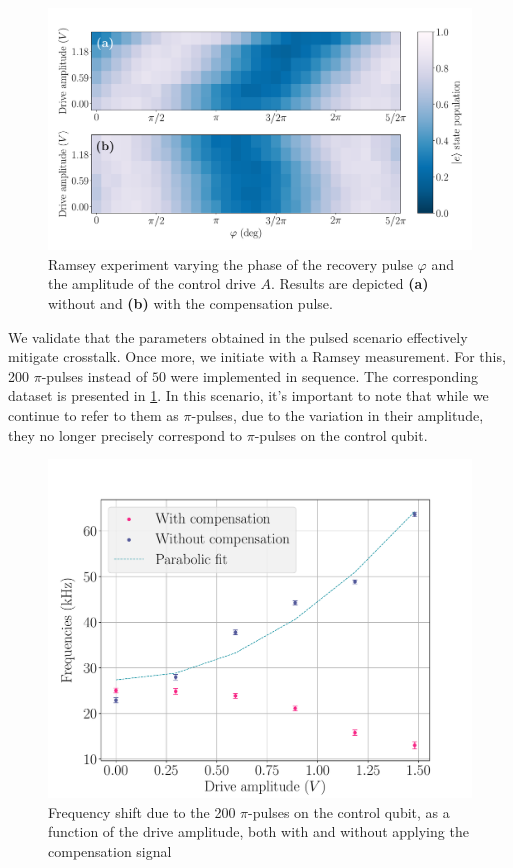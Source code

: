 
\begin{figure}
    \centering
    \includegraphics[width=\linewidth]{Images//Chap2.0/Ramsey_cancellatoin_pulsed.pdf}
    \vspace{-1cm}
    \caption{Ramsey experiment varying the phase of the recovery pulse $\varphi$ and the amplitude of the control drive $A$. Results are depicted \textbf{(a)} without and \textbf{(b)} with the compensation pulse.}
    \label{fig:RAMSEY_can_pulsed}
\end{figure}

We validate that the parameters obtained in the pulsed scenario effectively mitigate crosstalk.
Once more, we initiate with a Ramsey measurement.
For this, 200 $\pi$-pulses instead of $50$ were implemented in sequence.
The corresponding dataset is presented in \cref{fig:RAMSEY_can_pulsed}.
In this scenario, it's important to note that while we continue to refer to them as $\pi$-pulses, due to the variation in their amplitude, they no longer precisely correspond to $\pi$-pulses on the control qubit.

\begin{figure}[t!]
    \centering
    \includegraphics[width=0.75\linewidth]{Images//Chap2.0/frequencies_200.pdf}
    \caption{Frequency shift due to the 200 $\pi$-pulses on the control qubit, as a function of the drive amplitude, both with and without applying the compensation signal}
    \label{fig:Freq_pulsed}
\end{figure}

